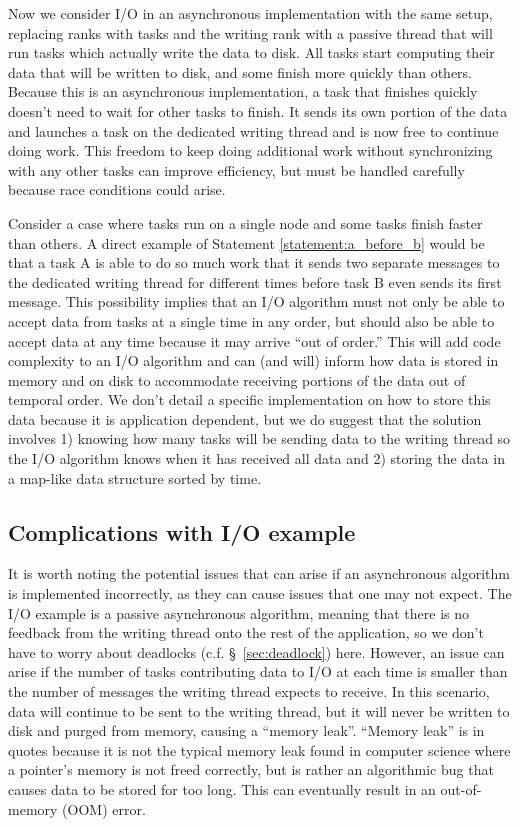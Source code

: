 \begin{bibunit}[unsrtnat]
Now we consider I/O in an asynchronous implementation with the same setup,
replacing ranks with tasks and the writing rank with a passive thread that will
run tasks which actually write the data to disk. All tasks start computing their
data that will be written to disk, and some finish more quickly than others.
Because this is an asynchronous implementation, a task that finishes quickly
doesn't need to wait for other tasks to finish. It sends its own portion of the
data and launches a task on the dedicated writing thread and is now free to
continue doing work. This freedom to keep doing additional work without
synchronizing with any other tasks can improve efficiency, but must be handled
carefully because race conditions could arise.

Consider a case where tasks run on a single node and some tasks finish faster
than others. A direct example of Statement \ref{statement:a_before_b} would be
that a task A is able to do so much work that it sends two separate messages to
the dedicated writing thread for different times before task B even sends its first
message. This possibility implies that an I/O algorithm must not only be able to
accept data from tasks at a single time in any order, but should also be able to
accept data at any time because it may arrive ``out of order.'' This will add
code complexity to an I/O algorithm and can (and will) inform how data is stored
in memory and on disk to accommodate receiving portions of the data out of
temporal order. We don't detail a specific implementation on how to store this
data because it is application dependent, but we do suggest that the solution
involves 1) knowing how many tasks will be sending data to the writing thread
so the I/O algorithm knows when it has received all data and 2) storing the data
in a map-like data structure sorted by time.

\subsection{Complications with I/O example\label{sec:io-complications}}

It is worth noting the potential issues that can arise if an asynchronous
algorithm is implemented incorrectly, as they can cause issues that one may not
expect. The I/O example is a passive asynchronous algorithm, meaning that there
is no feedback from the writing thread onto the rest of the application, so we
don't have to worry about deadlocks (c.f. \S~\ref{sec:deadlock}) here.
However, an issue can arise if the number of tasks contributing data to I/O at
each time is smaller than the number of messages the writing thread expects to
receive. In this scenario, data will continue to be sent to the writing thread,
but it will never be written to disk and purged from memory, causing a ``memory
leak''. ``Memory leak'' is in quotes because it is not the typical memory leak
found in computer science where a pointer's memory is not freed correctly, but
is rather an algorithmic bug that causes data to be stored for too long. This
can eventually result in an out-of-memory (OOM) error.


\end{bibunit}
